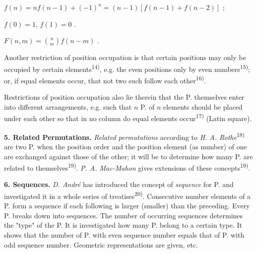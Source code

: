 \thispagestyle{fancy}

\vspace{0.5cm}

\begin{center}
    $f(n) = nf(n-1) + (-1)^n = (n-1)[f(n-1)+f(n-2)]$ ; 
    
    $f(0)=1$, $f(1)=0$ .
    
    $F(n,m) = \binom{n}{m}f(n-m)$ .
\end{center}

Another restriction of position occupation is that certain positions may only be occupied by certain elements\textsuperscript{14)}, e.g. the even positions only by even numbers\textsuperscript{15)}; or, if equal elements occur, that not two such follow each other\textsuperscript{16)}.

Restrictions of position occupation also lie therein that the P. themselves enter into different arrangements, e.g. such that $n$ P. of $n$ elements should be placed under each other so that in no column do equal elements occur\textsuperscript{17)} (Latin square).

\vspace{0.1cm}

\textbf{5. Related Permutations.} \textit{Related permutations} according to \textit{H. A. Rothe}\textsuperscript{18)} are two P. when the position order and the position element (as number) of one are exchanged against those of the other; it will be to determine how many P. are related to themselves\textsuperscript{19)}. \textit{P. A. Mac-Mahon} gives extensions of these concepts\textsuperscript{19)}.

\vspace{0.1cm}

\textbf{6. Sequences.} \textit{D. André} has introduced the concept of \textit{sequence} for P. and investigated it in a whole series of treatises\textsuperscript{20)}. Consecutive number elements of a P. form a sequence if each following is larger (smaller) than the preceding. Every P. breaks down into sequences. The number of occurring sequences determines the "type" of the P. It is investigated how many P. belong to a certain type. It shows that the number of P. with even sequence number equals that of P. with odd sequence number. Geometric representations are given, etc.

